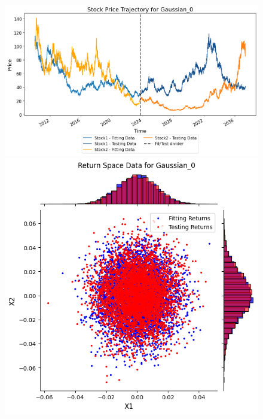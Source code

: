 \begin{figure}
    \centering
    \begin{minipage}{0.9\textwidth}
        \centering
        \begin{minipage}{0.54\textwidth}
            \centering
            \includegraphics[width=\textwidth]{4Method/pictures/PricePort1.png}
        \end{minipage}
        \hfill
        \begin{minipage}{0.34\textwidth}
            \centering
            \includegraphics[width=\textwidth]{4Method/pictures/ReturnPort1.png}

\end{minipage}
\end{minipage}
\end{figure}
